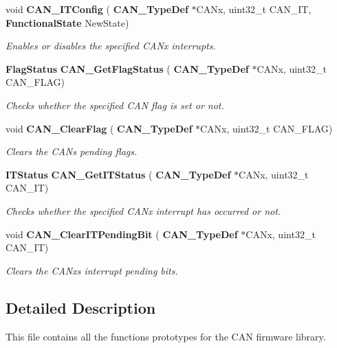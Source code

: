 \begin{DoxyCompactItemize}
void \textbf{ C\+A\+N\+\_\+\+I\+T\+Config} (\textbf{ C\+A\+N\+\_\+\+Type\+Def} $\ast$C\+A\+Nx, uint32\+\_\+t C\+A\+N\+\_\+\+IT, \textbf{ Functional\+State} New\+State)
\begin{DoxyCompactList}\small\item\em Enables or disables the specified C\+A\+Nx interrupts. \end{DoxyCompactList}\item 
\textbf{ Flag\+Status} \textbf{ C\+A\+N\+\_\+\+Get\+Flag\+Status} (\textbf{ C\+A\+N\+\_\+\+Type\+Def} $\ast$C\+A\+Nx, uint32\+\_\+t C\+A\+N\+\_\+\+F\+L\+AG)
\begin{DoxyCompactList}\small\item\em Checks whether the specified C\+AN flag is set or not. \end{DoxyCompactList}\item 
void \textbf{ C\+A\+N\+\_\+\+Clear\+Flag} (\textbf{ C\+A\+N\+\_\+\+Type\+Def} $\ast$C\+A\+Nx, uint32\+\_\+t C\+A\+N\+\_\+\+F\+L\+AG)
\begin{DoxyCompactList}\small\item\em Clears the C\+AN\textquotesingle{}s pending flags. \end{DoxyCompactList}\item 
\textbf{ I\+T\+Status} \textbf{ C\+A\+N\+\_\+\+Get\+I\+T\+Status} (\textbf{ C\+A\+N\+\_\+\+Type\+Def} $\ast$C\+A\+Nx, uint32\+\_\+t C\+A\+N\+\_\+\+IT)
\begin{DoxyCompactList}\small\item\em Checks whether the specified C\+A\+Nx interrupt has occurred or not. \end{DoxyCompactList}\item 
void \textbf{ C\+A\+N\+\_\+\+Clear\+I\+T\+Pending\+Bit} (\textbf{ C\+A\+N\+\_\+\+Type\+Def} $\ast$C\+A\+Nx, uint32\+\_\+t C\+A\+N\+\_\+\+IT)
\begin{DoxyCompactList}\small\item\em Clears the C\+A\+Nx\textquotesingle{}s interrupt pending bits. \end{DoxyCompactList}\end{DoxyCompactItemize}


\subsection{Detailed Description}
This file contains all the functions prototypes for the C\+AN firmware library. 

